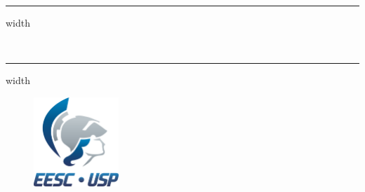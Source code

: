 \thispagestyle{empty}

\newcommand{\lyxline}[1]{
  {#1 \vspace{1ex} \hrule width \columnwidth \vspace{1ex}}
}

\begin{center}
\Huge { \textsf{\instituicao} }\\
\large{ \textsf{\instituto  } }\\
\small{ \textsf{\disciplina } }\\
\small{ \textsf{\professor  } }
\end{center}


\vspace{6cm}

\lyxline{}
\begin{center}
\noindent
\Huge{ \textsf{\bf \titulo} }\\
\vspace{1em}
\large{\textsf{\autor}}
\end{center}
\lyxline{}

\vspace{5cm}

\begin{figure} [h]
\centering
\includegraphics[width=3.2cm]{logo_eesc_vertical.png}
\end{figure}

\begin{center}
\textsf{\data}
\end{center}


